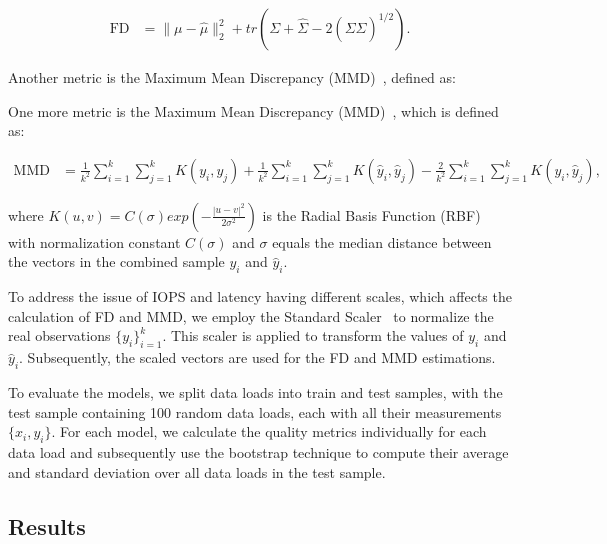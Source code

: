 \begin{equation}
\begin{split}
\text{FD} & = \| \mu -\hat{\mu} \|^{2}_{2} + tr(\Sigma + \hat{\Sigma} - 2(\Sigma\hat{\Sigma})^{1/2} ).
\end{split}
\end{equation}

Another metric is the Maximum Mean Discrepancy (MMD)~\cite{JMLR:v13:gretton12a}, defined as:


One more metric is the Maximum Mean Discrepancy (MMD)~\cite{JMLR:v13:gretton12a}, which is defined as:

\begin{equation}
\begin{split}
\text{MMD} & = \frac{1}{k^2}\sum_{i=1}^{k}\sum_{j=1}^{k} K(y_i, y_j) +\frac{1}{k^2}\sum_{i=1}^{k}\sum_{j=1}^{k} K(\hat{y}_i, \hat{y}_j) - \frac{2}{k^2}\sum_{i=1}^{k}\sum_{j=1}^{k} K(y_i, \hat{y}_j), 
\end{split}
\end{equation}

where $K(u, v) = C(\sigma) exp(-\frac{|u - v|^2}{2\sigma^2})$ is the Radial Basis Function (RBF) with normalization constant $C(\sigma)$ and $\sigma$ equals the median distance between the vectors in the combined sample $y_i$ and $\hat{y}_i$.

To address the issue of IOPS and latency having different scales, which affects the calculation of FD and MMD, we employ the Standard Scaler~\cite{scikit-learn} to normalize the real observations $\{y_i\}_{i=1}^{k}$. This scaler is applied to transform the values of $y_i$ and $\hat{y}_i$. Subsequently, the scaled vectors are used for the FD and MMD estimations.

To evaluate the models, we split data loads into train and test samples, with the test sample containing 100 random data loads, each with all their measurements $\{x_i, y_i\}$. For each model, we calculate the quality metrics individually for each data load and subsequently use the bootstrap technique to compute their average and standard deviation over all data loads in the test sample.


\subsection{Results}





